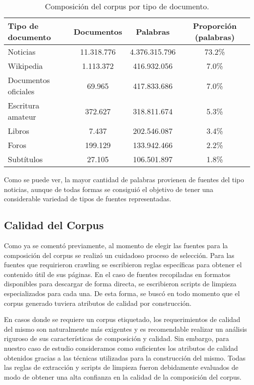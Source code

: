 \begin{table*}[t]
    \centering
    \begin{tabular}{lccc}
        \hline
        Tipo de documento & Documentos & Palabras & Proporción (palabras)\\
        \hline
        Noticias & 11.318.776 & 4.376.315.796 & 73.2\%\\
        Wikipedia & 1.113.372 & 416.932.056 & 7.0\%\\
        Documentos oficiales & 69.965 & 417.833.686 & 7.0\%\\
        Escritura amateur & 372.627 & 318.811.674 & 5.3\%\\
        Libros & 7.437 & 202.546.087 & 3.4\%\\
        Foros & 199.129 & 133.942.466 & 2.2\%\\
        Subtítulos & 27.105 & 106.501.897 & 1.8\%\\
        \hline
    \end{tabular}
    \caption{Composición del corpus por tipo de documento.}
    \label{table:corpus_doc_type}
\end{table*}

Como se puede ver, la mayor cantidad de palabras provienen de fuentes del tipo noticias,
aunque de todas formas se consiguió el objetivo de tener una considerable variedad de
tipos de fuentes representadas.

\subsection{Calidad del Corpus}

Como ya se comentó previamente, al momento de elegir las fuentes para la composición
del corpus se realizó un cuidadoso proceso de selección. Para las fuentes que requirieron
crawling se escribieron reglas específicas para obtener el contenido útil de sus páginas. En
el caso de fuentes recopiladas en formatos disponibles para descargar de forma directa, se
escribieron scripts de limpieza especializados para cada una. De esta forma, se buscó en
todo momento que el corpus generado tuviera atributos de calidad por construcción.

En casos donde se requiere un corpus etiquetado, los requerimientos de calidad del mismo
son naturalmente más exigentes y es recomendable realizar un análisis riguroso de sus
características de composición y calidad. Sin embargo, para nuestro caso de estudio
consideramos como suficientes los atributos de calidad obtenidos gracias a las técnicas
utilizadas para la construcción del mismo. Todas las reglas de extracción y scripts de
limpieza fueron debidamente evaluados de modo de obtener una alta confianza en la calidad
de la composición del corpus.
